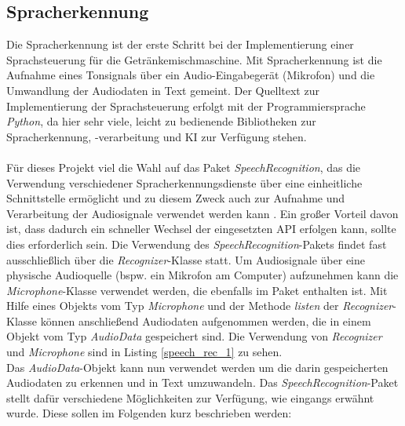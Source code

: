\subsection{Spracherkennung}\label{section:Spracherkennung}
Die Spracherkennung ist der erste Schritt bei der Implementierung einer Sprachsteuerung für die Getränkemischmaschine. Mit Spracherkennung ist die Aufnahme eines Tonsignals über ein Audio-Eingabegerät (Mikrofon) und die Umwandlung der Audiodaten in Text gemeint. Der Quelltext zur Implementierung der Sprachsteuerung erfolgt mit der Programmiersprache \textit{Python}, da hier sehr viele, leicht zu bedienende Bibliotheken zur Spracherkennung, -verarbeitung und \ac{KI} zur Verfügung stehen.\\\\
Für dieses Projekt viel die Wahl auf das Paket \textit{SpeechRecognition}, das die Verwendung verschiedener Spracherkennungsdienste über eine einheitliche Schnittstelle ermöglicht und zu diesem Zweck auch zur Aufnahme und Verarbeitung der Audiosignale verwendet werden kann \cite{speechrecognition}. Ein großer Vorteil davon ist, dass dadurch ein schneller Wechsel der eingesetzten \ac{API} erfolgen kann, sollte dies erforderlich sein. Die Verwendung des \textit{SpeechRecognition}-Pakets findet fast ausschließlich über die \textit{Recognizer}-Klasse statt. Um Audiosignale über eine physische Audioquelle (bspw. ein Mikrofon am Computer) aufzunehmen kann die \textit{Microphone}-Klasse verwendet werden, die ebenfalls im Paket enthalten ist. Mit Hilfe eines Objekts vom Typ \textit{Microphone} und der Methode \textit{listen} der \textit{Recognizer}-Klasse können anschließend Audiodaten aufgenommen werden, die in einem Objekt vom Typ \textit{AudioData} gespeichert sind. Die Verwendung von \textit{Recognizer} und \textit{Microphone} sind in Listing \ref{speech_rec_1} zu sehen.\\ 

Das \textit{AudioData}-Objekt kann nun verwendet werden um die darin gespeicherten Audiodaten zu erkennen und in Text umzuwandeln. Das \textit{SpeechRecognition}-Paket stellt dafür verschiedene Möglichkeiten zur Verfügung, wie eingangs erwähnt wurde. Diese sollen im Folgenden kurz beschrieben werden:
